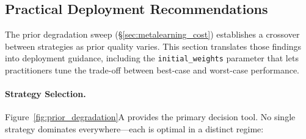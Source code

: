 
\subsection{Practical Deployment Recommendations}
\label{sec:practical}

The prior degradation sweep (\S\ref{sec:metalearning_cost}) establishes
a crossover between strategies as prior quality varies.
This section translates those findings into deployment guidance,
including the \texttt{initial\_weights} parameter that lets
practitioners tune the trade-off between best-case and worst-case
performance.

\paragraph{Strategy Selection.}
Figure~\ref{fig:prior_degradation}A provides the primary decision tool.
No single strategy dominates everywhere---each is optimal in a distinct
regime:

